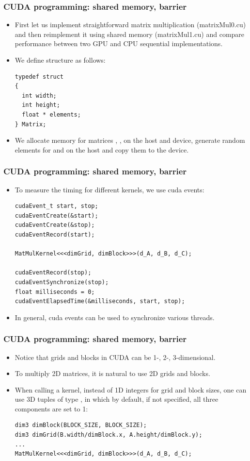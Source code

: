 \begin{frame}[fragile]
  \frametitle{CUDA programming: shared memory, barrier}
\begin{itemize}
\item First let us implement straightforward matrix multiplication ({\color{mycolorcli}matrixMul0.cu})
  and then reimplement it using shared  memory ({\color{mycolorcli}matrixMul1.cu}) and compare performance between two GPU and CPU sequential implementations.
\item We define  structure as follows:
{\color{mycolorcode}
\begin{verbatim}
typedef struct
{
  int width;
  int height;
  float * elements;
} Matrix;
\end{verbatim}
}
\item We allocate memory for matrices , ,  on the host and device, generate random elements for  and  on the host and copy them to the device.
\end{itemize}
\end{frame}

\begin{frame}[fragile]
  \frametitle{CUDA programming: shared memory, barrier}
\begin{itemize}
\item To measure the timing for different kernels, we use cuda events:

{\color{mycolorcode}
\begin{verbatim}
cudaEvent_t start, stop;
cudaEventCreate(&start);
cudaEventCreate(&stop);
cudaEventRecord(start);

MatMulKernel<<<dimGrid, dimBlock>>>(d_A, d_B, d_C);

cudaEventRecord(stop);
cudaEventSynchronize(stop);
float milliseconds = 0;
cudaEventElapsedTime(&milliseconds, start, stop);
\end{verbatim}
}

\item In general, cuda events can be used to synchronize various threads.

\end{itemize}
\end{frame}

\begin{frame}[fragile]
  \frametitle{CUDA programming: shared memory, barrier}
\begin{itemize}
\item Notice that grids and blocks in CUDA can be 1-, 2-, 3-dimensional.
\item To multiply 2D matrices, it is natural to use 2D grids and blocks.
\item When calling a kernel, instead of 1D integers for grid and block sizes, 
  one can use 3D tuples of type , in which by default, if not specified, all three components are set to 1:
{\color{mycolorcode}
\begin{verbatim}
dim3 dimBlock(BLOCK_SIZE, BLOCK_SIZE);
dim3 dimGrid(B.width/dimBlock.x, A.height/dimBlock.y);
...
MatMulKernel<<<dimGrid, dimBlock>>>(d_A, d_B, d_C);
\end{verbatim}
}
\end{itemize}
\end{frame}

